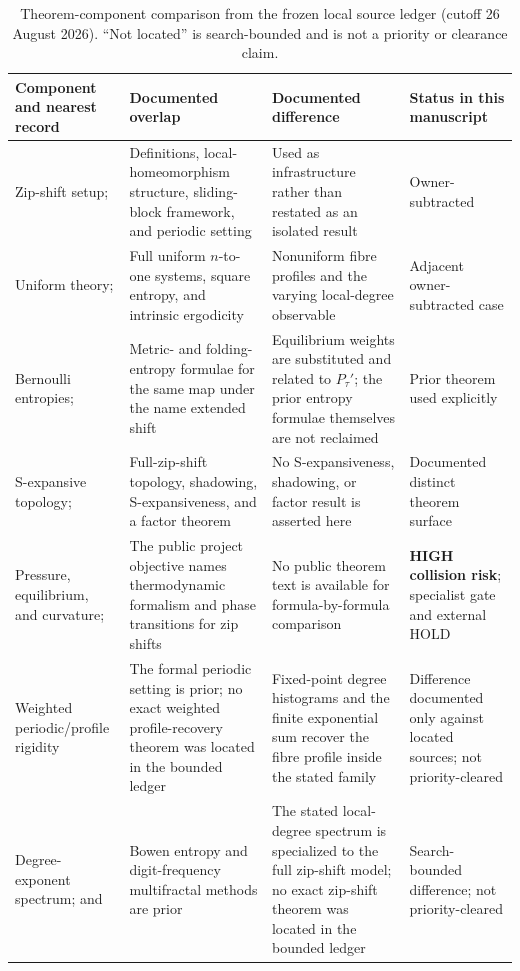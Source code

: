 \begin{table}[t]
\centering
\caption{Theorem-component comparison from the frozen local source ledger
(cutoff 26 August 2026).  ``Not located'' is search-bounded and is not a
priority or clearance claim.}\label{tab:component-comparison}
\small
\begin{tabularx}{\textwidth}{@{}YYYY@{}}
\toprule
Component and nearest record & Documented overlap & Documented difference &
Status in this manuscript\\
\midrule
Zip-shift setup; \citet{LameiMehdipour2025}
& Definitions, local-homeomorphism structure, sliding-block framework, and
periodic setting
& Used as infrastructure rather than restated as an isolated result
& Owner-subtracted\\
Uniform theory; \citet{MehdipourJangjooye2025}
& Full uniform $n$-to-one systems, square entropy, and intrinsic ergodicity
& Nonuniform fibre profiles and the varying local-degree observable
& Adjacent owner-subtracted case\\
Bernoulli entropies; \citet{MartinsMattosVarao2026}
& Metric- and folding-entropy formulae for the same map under the name
extended shift
& Equilibrium weights are substituted and related to $P_\tau'$; the prior
entropy formulae themselves are not reclaimed
& Prior theorem used explicitly\\
S-expansive topology; \citet{LameiMehdipourVargas2025}
& Full-zip-shift topology, shadowing, S-expansiveness, and a factor theorem
& No S-expansiveness, shadowing, or factor result is asserted here
& Documented distinct theorem surface\\
Pressure, equilibrium, and curvature; \citet{MehdipourUFVProject2024}
& The public project objective names thermodynamic formalism and phase
transitions for zip shifts
& No public theorem text is available for formula-by-formula comparison
& \textbf{HIGH collision risk}; specialist gate and external HOLD\\
Weighted periodic/profile rigidity
& The formal periodic setting is prior; no exact weighted profile-recovery
theorem was located in the bounded ledger
& Fixed-point degree histograms and the finite exponential sum recover the
fibre profile inside the stated family
& Difference documented only against located sources; not priority-cleared\\
Degree-exponent spectrum; \citet{Bowen1973} and
\citet{BarreiraSaussolSchmeling2002}
& Bowen entropy and digit-frequency multifractal methods are prior
& The stated local-degree spectrum is specialized to the full zip-shift
model; no exact zip-shift theorem was located in the bounded ledger
& Search-bounded difference; not priority-cleared\\
\bottomrule
\end{tabularx}
\end{table}

